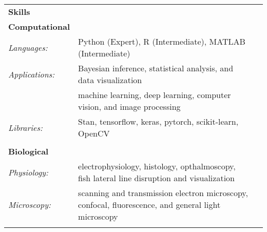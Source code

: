 \documentclass[letterpaper,10pt,oneside]{article}
\begin{document}
\begin{longtable}{@{} l p{5.3in}l}
\Large{\textbf{Skills}} \vspace{5mm} \\
\large{\textbf{Computational}} \\
\normalsize{\textit{Languages: }}
& Python (Expert), R (Intermediate), MATLAB (Intermediate) \vspace{1mm}\\ %
\normalsize{\textit{Applications: }} 
& Bayesian inference, statistical analysis, and data visualization \\ 
& machine learning, deep learning, computer vision, and image processing \vspace{1mm}\\
\normalsize{\textit{Libraries: }}
& Stan, tensorflow, keras, pytorch, scikit-learn, OpenCV \\
& \\
\large{\textbf{Biological}} \\
\normalsize{\textit{Physiology: }}
& electrophysiology, histology, opthalmoscopy, fish lateral line disruption and visualization \vspace{1mm} \\
\normalsize{\textit{Microscopy: }}
& scanning and transmission electron microscopy, confocal, fluorescence, and general light microscopy \vspace{1mm}\\
& \\
\end{longtable}

\newpage

\end{document}
